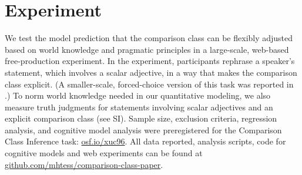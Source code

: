 \documentclass[doc, floatsintext]{apa6}
\newcommand{\mht}[1]{\textcolor{Blue}{[mht: #1]}}
\begin{document}
\section{Experiment}


We test the model prediction that the comparison class can be flexibly adjusted based on world knowledge and pragmatic principles in a large-scale, web-based free-production experiment.
In the experiment, participants rephrase a speaker's statement, which involves a scalar adjective, in a way that makes the comparison class explicit.
(A smaller-scale, forced-choice version of this task was reported in .)
To norm world knowledge needed in our quantitative modeling, we also measure truth judgments for statements involving scalar adjectives and an explicit comparison class (see SI).
Sample size, exclusion criteria, regression analysis, and cognitive model analysis were preregistered for the Comparison Class Inference task: \url{osf.io/xuc96}.
All data reported, analysis scripts, code for cognitive models and web experiments can be found at \url{github.com/mhtess/comparison-class-paper}.



\end{document}
